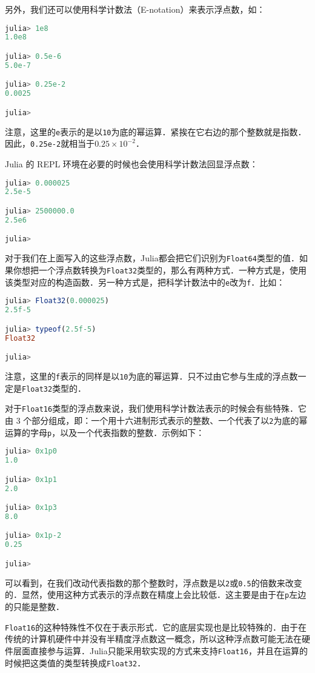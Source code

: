 另外，我们还可以使用科学计数法（E-notation）来表示浮点数，如：
\begin{lstlisting}[language=julia]
julia> 1e8
1.0e8

julia> 0.5e-6
5.0e-7

julia> 0.25e-2
0.0025

julia> 
\end{lstlisting}

注意，这里的\verb|e|表示的是以\verb|10|为底的幂运算．紧挨在它右边的那个整数就是指数．因此，\verb|0.25e-2|就相当于$0.25\times10^{-2}$．

Julia 的 REPL 环境在必要的时候也会使用科学计数法回显浮点数：
\begin{lstlisting}[language=julia]
julia> 0.000025
2.5e-5

julia> 2500000.0
2.5e6

julia> 
\end{lstlisting}

对于我们在上面写入的这些浮点数，Julia都会把它们识别为\verb|Float64|类型的值．如果你想把一个浮点数转换为\verb|Float32|类型的，那么有两种方式．一种方式是，使用该类型对应的构造函数．另一种方式是，把科学计数法中的\verb|e|改为\verb|f|．比如：
\begin{lstlisting}[language=julia]
julia> Float32(0.000025)
2.5f-5

julia> typeof(2.5f-5)
Float32

julia> 
\end{lstlisting}

注意，这里的\verb|f|表示的同样是以\verb|10|为底的幂运算．只不过由它参与生成的浮点数一定是\verb|Float32|类型的．

对于\verb|Float16|类型的浮点数来说，我们使用科学计数法表示的时候会有些特殊．它由 3 个部分组成，即：一个用十六进制形式表示的整数、一个代表了以\verb|2|为底的幂运算的字母\verb|p|，以及一个代表指数的整数．示例如下：
\begin{lstlisting}[language=julia]
julia> 0x1p0
1.0

julia> 0x1p1
2.0

julia> 0x1p3
8.0

julia> 0x1p-2
0.25

julia> 
\end{lstlisting}

可以看到，在我们改动代表指数的那个整数时，浮点数是以\verb|2|或\verb|0.5|的倍数来改变的．显然，使用这种方式表示的浮点数在精度上会比较低．这主要是由于在\verb|p|左边的只能是整数．

\verb|Float16|的这种特殊性不仅在于表示形式．它的底层实现也是比较特殊的．由于在传统的计算机硬件中并没有半精度浮点数这一概念，所以这种浮点数可能无法在硬件层面直接参与运算．Julia只能采用软实现的方式来支持\verb|Float16|，并且在运算的时候把这类值的类型转换成\verb|Float32|．

